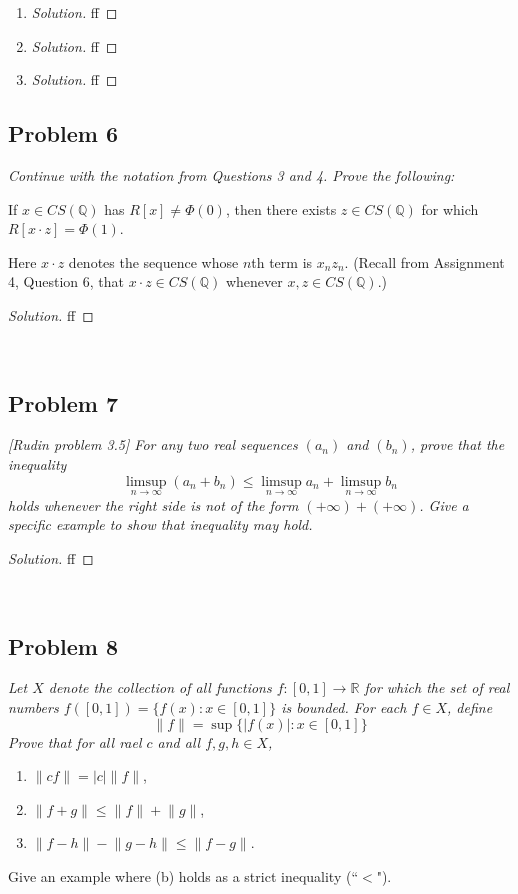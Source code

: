 \documentclass{article}
\newcommand{\Q}{{\mathbb Q}}
\newcommand{\R}{{\mathbb R}}
\begin{document}
\begin{enumerate}
	\item \begin{proof}[Solution]\let\qed\relax
		ff
	\end{proof}
	\item \begin{proof}[Solution]\let\qed\relax
		ff
	\end{proof}
	\item \begin{proof}[Solution]\let\qed\relax
		ff
	\end{proof} 
\end{enumerate}
\clearpage

\subsection*{Problem 6}
{\it Continue with the notation from Questions 3 and 4. Prove the following:
\begin{center}
	If $x \in CS(\Q)$ has $R[x] \neq \Phi(0)$,
	then there exists $z \in CS(\Q)$ for which $R[x\cdot z] = \Phi(1)$.
\end{center}
Here $x \cdot z$ denotes the sequence whose $n$th term is $x_nz_n$.
(Recall from Assignment 4, Question 6,
that $x\cdot z \in CS(\Q)$ whenever $x,z \in CS(\Q)$.)}

\begin{proof}[Solution]\let\qed\relax
	ff
\end{proof}
\clearpage
~\clearpage

\subsection*{Problem 7}
{\it [Rudin problem 3.5]
For any two real sequences $(a_n)$ and $(b_n)$, prove that the inequality
\[
	\limsup_{n\to\infty}(a_n + b_n) \leq \limsup_{n\to\infty}a_n + \limsup_{n\to\infty}b_n
\]
holds whenever the right side is not of the form $(+\infty) + (+\infty)$.
Give a specific example to show that inequality may hold.}

\begin{proof}[Solution]\let\qed\relax
	ff
\end{proof}
\clearpage
~\clearpage

\subsection*{Problem 8}
{\it Let $X$ denote the collection of all functions $f \colon [0,1] \to \R$
for which the set of real numbers $f([0,1]) = \{f(x) \colon x \in [0,1]\}$ is bounded.
For each $f \in X$, define
\[
	\lVert f \rVert = \sup\{|f(x)| \colon x \in [0,1]\}
\]
Prove that for all rael $c$ and all $f,g,h \in X$,
\begin{enumerate}
	\item $\lVert cf \rVert = |c|\lVert f \rVert$,
	\item $\lVert f + g \rVert \leq \lVert f \rVert + \lVert g \rVert$,
	\item $\lVert f - h \rVert - \lVert g - h\rVert \leq \lVert f - g\rVert$.
\end{enumerate}
Give an example where (b) holds as a strict inequality (``$<$").}
\end{document}
